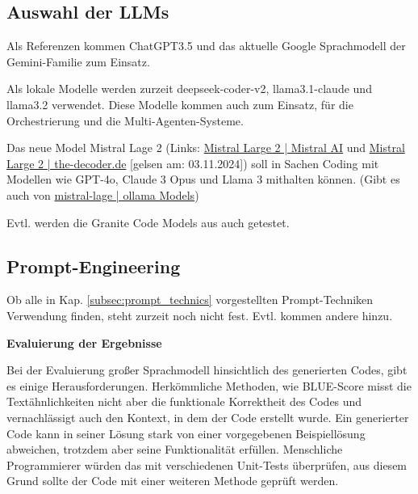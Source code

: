\subsection{Auswahl der LLMs}
\begin{tcolorbox}[
	enhanced,
	colback=yellow!5!white,
	colframe=yellow!75!black!50,
	title= Wird noch im Verlauf der Arbeit geändert
	]
	Als Referenzen kommen ChatGPT3.5 und das aktuelle Google Sprachmodell der Gemini-Familie zum Einsatz.\vspace{0.2cm}

	Als lokale Modelle werden zurzeit deepseek-coder-v2, llama3.1-claude und llama3.2 verwendet. Diese Modelle kommen auch zum Einsatz, für die Orchestrierung und die Multi-Agenten-Systeme.\vspace{0.2cm}
	
	Das neue Model Mistral Lage 2 (Links: \href{https://mistral.ai/news/mistral-large-2407/}{Mistral Large 2 | Mistral AI} und \href{https://the-decoder.de/mistral-large-2-soll-meta-llama-3-in-sachen-effizienz-schlagen-und-der-llm-ozean-wird-roter/}{Mistral Large 2 | the-decoder.de} [gelsen am: 03.11.2024]) soll in Sachen Coding mit Modellen wie GPT-4o, Claude 3 Opus und Llama 3 mithalten können. (Gibt es auch von \href{https://ollama.com/library/mistral-large}{mistral-lage | ollama Models})\vspace{0.2cm}
	
	Evtl. werden die Granite Code Models aus \cite{mishra-2024} auch getestet.
\end{tcolorbox}


\subsection{Prompt-Engineering}
\begin{tcolorbox}[
	enhanced,
	colback=yellow!5!white,
	colframe=yellow!75!black!50,
	title= Wird noch im Verlauf der Arbeit geändert
	]
	Ob alle in Kap. \ref{subsec:prompt_technics} vorgestellten Prompt-Techniken Verwendung finden, steht zurzeit noch nicht fest. Evtl. kommen andere hinzu.
\end{tcolorbox}

\textbf{Evaluierung der Ergebnisse}\vspace{0.2cm}

Bei der Evaluierung großer Sprachmodell hinsichtlich des generierten Codes, gibt es einige Herausforderungen. Herkömmliche Methoden, wie BLUE-Score misst die Textähnlichkeiten nicht aber die funktionale Korrektheit des Codes und vernachlässigt auch den Kontext, in dem der Code erstellt wurde. Ein generierter Code kann in seiner Lösung stark von einer vorgegebenen Beispiellösung abweichen, trotzdem aber seine Funktionalität erfüllen. Menschliche Programmierer würden das mit verschiedenen Unit-Tests überprüfen, aus diesem Grund sollte der Code mit einer weiteren Methode geprüft werden.\vspace{0.2cm}

